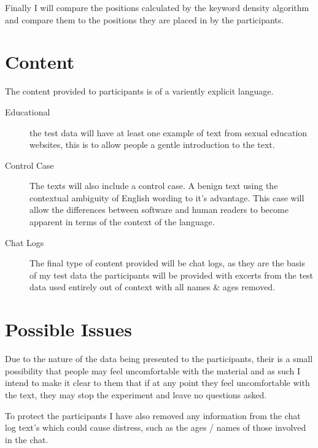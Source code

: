 \documentclass{article}
\begin{document}
Finally I will compare the positions calculated by the keyword density algorithm and compare them to the positions they are placed in by the participants.

\section*{Content}
The content provided to participants is of a variently explicit language. 
\begin{description}
\item[Educational]
the test data will have at least one example of text from sexual education websites, this is to allow people a gentle introduction to the text. 
\item[Control Case]
The texts will also include a control case. A benign text using the contextual ambiguity of English wording to it's advantage. This case will allow the differences between software and human readers to become apparent in terms of the context of the language.
\item[Chat Logs]
The final type of content provided will be chat logs, as they are the basis of my test data the participants will be provided with excerts from the test data used entirely out of context with all names \& ages removed.
\end{description}
\section*{Possible Issues}
Due to the nature of the data being presented to the participants, their is a small possibility that people may feel uncomfortable with the material and as such I intend to make it clear to them that if at any point they feel uncomfortable with the text, they may stop the experiment and leave no questions asked. 

To protect the participants I have also removed any information from the chat log text's which could cause distress, such as the ages / names of those involved in the chat.
\end{document}
